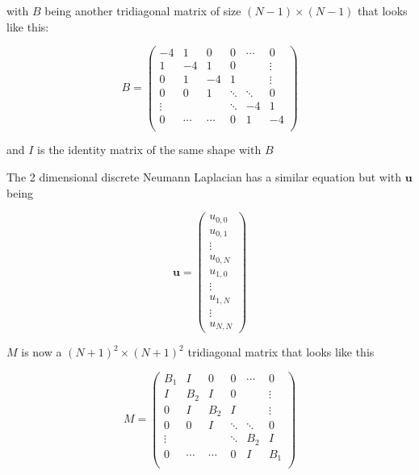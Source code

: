 with $B$ being another tridiagonal matrix of size $(N-1) \times (N-1)$ that looks like this:

\begin{equation}
B =
\begin{pmatrix}
    -4    &     1&     0&     0&\cdots&      0\\
    1     &    -4&     1&     0&      & \vdots\\
    0     &     1&    -4&     1&      & \vdots\\
    0     &     0&     1&\ddots&\ddots&      0\\
    \vdots&      &      &\ddots&    -4&      1\\
    0     &\cdots&\cdots&     0&     1&     -4\\
\end{pmatrix}
\end{equation}

and $I$ is the identity matrix of the same shape with $B$

The 2 dimensional discrete Neumann Laplacian has a similar equation but with $\mathbf{u}$ being 

\begin{equation}
    \mathbf{u} = 
\begin{pmatrix}
    u_{0,0}\\
    u_{0,1}\\
    \vdots\\
    u_{0,N}\\
    u_{1,0}\\
    \vdots\\
    u_{1,N}\\
    \vdots\\
    u_{N,N}
\end{pmatrix}
\end{equation}

$M$ is now a $(N+1)^2 \times (N+1)^2$ tridiagonal matrix that looks like this\autocite{square_plate}

\begin{equation}
    M =
\begin{pmatrix}
    B_1   &     I&     0&     0&\cdots&      0\\
    I     &   B_2&     I&     0&      & \vdots\\
    0     &     I&   B_2&     I&      & \vdots\\
    0     &     0&     I&\ddots&\ddots&      0\\
    \vdots&      &      &\ddots&   B_2&      I\\
    0     &\cdots&\cdots&     0&     I&    B_1\\
\end{pmatrix}
\end{equation}

